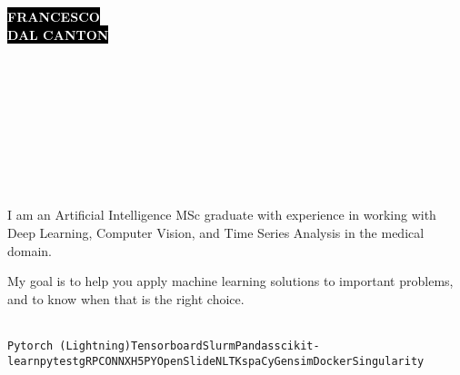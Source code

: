 \documentclass[9pt]{developercv}
\begin{document}

\begin{minipage}[t]{0.45\textwidth}
    \vspace{-\baselineskip}
    \colorbox{black}{{\fontsize{26}{0}\textcolor{white}{\textbf{\MakeUppercase{Francesco}}}}}\\    
    \colorbox{black}{{\fontsize{26}{0}\textcolor{white}{\textbf{\MakeUppercase{Dal Canton}}}}}\\
\end{minipage}
\begin{minipage}[t]{0.27\textwidth}
    \vspace{-\baselineskip}
    \\
    \\
    \\
\end{minipage}
\begin{minipage}[t]{0.28\textwidth}
    \vspace{-\baselineskip}
    \\
    \\
    \\
\end{minipage}

\vspace{1.5cm}


\begin{minipage}[t]{0.45\textwidth}
    \vspace{-\baselineskip}
    \\
    I am an Artificial Intelligence MSc graduate with experience in working with Deep Learning, Computer Vision, and Time Series Analysis in the medical domain.
    
    My goal is to help you apply machine learning solutions to important problems, and to know when that is the right choice.
\end{minipage}
\hfill
\begin{minipage}[t]{0.45\textwidth}
    \vspace{-\baselineskip}
    \\
    \texttt{Pytorch (Lightning)}\slashsep\texttt{Tensorboard}\slashsep\texttt{Slurm}\slashsep\texttt{Pandas}\slashsep\texttt{scikit-learn}\slashsep\texttt{pytest}\slashsep\texttt{gRPC}\slashsep\texttt{ONNX}\slashsep\texttt{H5PY}\slashsep\texttt{OpenSlide}\slashsep\texttt{NLTK}\slashsep\texttt{spaCy}\slashsep\texttt{Gensim}\slashsep\texttt{Docker}\slashsep\texttt{Singularity}
\end{minipage}
\end{document}
